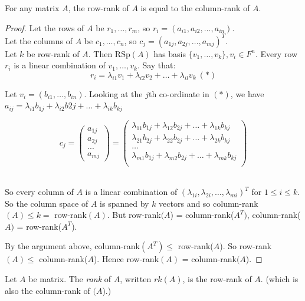 \documentclass[10pt]{scrartcl}
\begin{document}
\begin{theorem} For any matrix $A$, the row-rank of $A$ is equal to the column-rank of $A$.\end{theorem}
 
 \begin{proof}
 Let the rows of $A$ be $r_1, \dots, r_m$, so $r_i = (a_{i1}, a_{i2},\dots,a_{in})$.\\
 
 Let the columns of $A$ be $c_1,\dots,c_n$, so $c_j = (a_{1j}, a_{2j},\dots,a_{mj})^T$.\\
 
 Let $k$ be row-rank of $A$. Then $\text{RSp}(A)$ has basis $\{v_1,\dots,v_k\}, v_i \in F^n$. Every row $r_i$ is a linear combination of $v_1,\dots,v_k$. Say that:
 \[r_i = \lambda_{i1}v_1 + \lambda_{i2}v_2 + \dots + \lambda_{il}v_k ~(*)\]
 
 Let $v_i = (b_{i1}, \dots, b_{in})$. Looking at the $j$th co-ordinate in $(*)$, we have $a_{ij} = \lambda_{i1}b_{1j} + \lambda_{i2}b{2j} + \dots + \lambda_{ik}b_{kj}$
 
 \[c_j = \begin{pmatrix}
 a_{1j}\\a_{2j}\\ ... \\ a_{mj}
\end{pmatrix}
= 
\begin{pmatrix}
\lambda_{11}b_{1j} + \lambda_{12}b_{2j} + \dots + \lambda_{1k}b_{kj}\\
\lambda_{21}b_{2j} + \lambda_{22}b_{2j} + \dots + \lambda_{2k}b_{kj}\\
\dots \\
\lambda_{m1}b_{1j} + \lambda_{m2}b_{2j} + \dots + \lambda_{mk}b_{kj}\\
\end{pmatrix}\]~

So every column of $A$ is a linear combination of $(\lambda_{1i},\lambda_{2i},\dots,\lambda_{mi})^T$ for $1 \leq i \leq k$. So the column space of $A$ is spanned by $k$ vectors and so column-rank$(A) \leq k = $ row-rank$(A)$. But row-rank$(A$) = column-rank($A^T)$, column-rank($A)$ = row-rank($A^T$). 

By the argument above, column-rank$(A^T) \leq$ row-rank($A$). So row-rank$(A) \leq$ column-rank($A$). Hence row-rank$(A)$ = column-rank$(A$).
 \end{proof}\vspace*{5pt}

 
\begin{definition} Let $A$ be matrix. The \emph{rank} of $A$, written $rk(A)$, is the row-rank of $A$. (which is also the column-rank of $(A$).)	
\end{definition}\vspace*{10pt}
\end{document}
